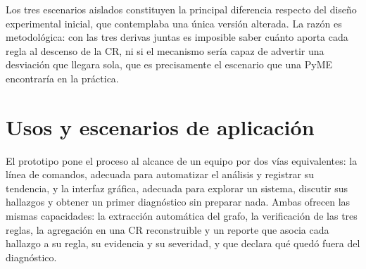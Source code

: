 Los tres escenarios aislados constituyen la principal diferencia respecto del diseño experimental inicial, que contemplaba una única versión alterada. La razón es metodológica: con las tres derivas juntas es imposible saber cuánto aporta cada regla al descenso de la CR, ni si el mecanismo sería capaz de advertir una desviación que llegara sola, que es precisamente el escenario que una PyME encontraría en la práctica.

\section{Usos y escenarios de aplicación}
\label{sec:usos}
El prototipo pone el proceso al alcance de un equipo por dos vías equivalentes: la línea de comandos, adecuada para automatizar el análisis y registrar su tendencia, y la interfaz gráfica, adecuada para explorar un sistema, discutir sus hallazgos y obtener un primer diagnóstico sin preparar nada. Ambas ofrecen las mismas capacidades: la extracción automática del grafo, la verificación de las tres reglas, la agregación en una CR reconstruible y un reporte que asocia cada hallazgo a su regla, su evidencia y su severidad, y que declara qué quedó fuera del diagnóstico.

